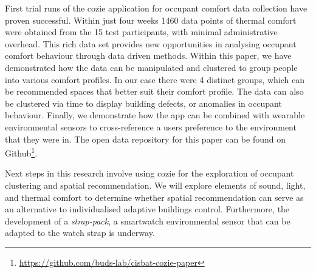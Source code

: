 
First trial runs of the cozie application for occupant comfort data collection have proven successful. Within just four weeks 1460 data points of thermal comfort were obtained from the 15 test participants, with minimal administrative overhead. This rich data set provides new opportunities in analysing occupant comfort behaviour through data driven methods. Within this paper, we have demonstrated how the data can be manipulated and clustered to group people into various comfort profiles. In our case there were 4 distinct groups, which can be recommended spaces that better suit their comfort profile. The data can also be clustered via time to display building defects, or anomalies in occupant behaviour. Finally, we demonstrate how the app can be combined with wearable environmental sensors to cross-reference a users preference to the environment that they were in. The open data repository for this paper can be found on Github\footnote{\url{https://github.com/buds-lab/cisbat-cozie-paper}}.

Next steps in this research involve using cozie for the exploration of occupant clustering and spatial recommendation. We will explore elements of sound, light, and thermal comfort to determine whether spatial recommendation can serve as an alternative to individualised adaptive buildings control. Furthermore, the development of a \emph{strap-pack}, a smartwatch environmental sensor that can be adapted to the watch strap is underway. 